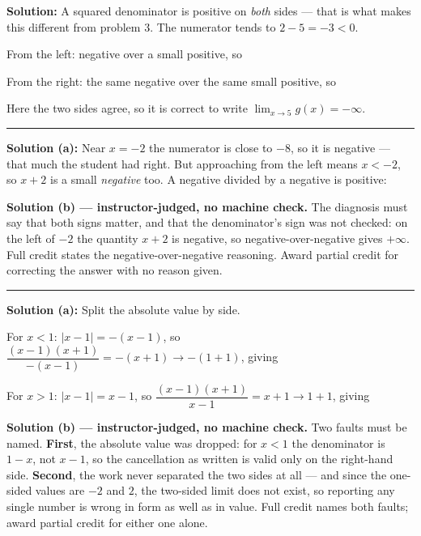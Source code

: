\documentclass[12pt]{article}
\begin{document}
\textbf{Solution:} A squared denominator is positive on \emph{both} sides ---
that is what makes this different from problem 3. The numerator tends to
$2 - 5 = -3 < 0$.

From the left: negative over a small positive, so \ans{-\infty}

From the right: the same negative over the same small positive, so
\ans{-\infty}

Here the two sides agree, so it is correct to write
$\lim_{x\to5} g(x) = -\infty$.

\vspace{0.2cm}\noindent\rule{\linewidth}{0.2pt}\vspace{0.2cm}


\textbf{Solution (a):} Near $x = -2$ the numerator is close to $-8$, so it is
negative --- that much the student had right. But approaching from the left
means $x < -2$, so $x + 2$ is a small \emph{negative} too. A negative divided by
a negative is positive:
\ans{+\infty}

\textbf{Solution (b) --- instructor-judged, no machine check.} The diagnosis
must say that both signs matter, and that the denominator's sign was not
checked: on the left of $-2$ the quantity $x + 2$ is negative, so
negative-over-negative gives $+\infty$. Full credit states the
negative-over-negative reasoning. Award partial credit for correcting the answer
with no reason given.

\vspace{0.2cm}\noindent\rule{\linewidth}{0.2pt}\vspace{0.2cm}


\textbf{Solution (a):} Split the absolute value by side.

For $x < 1$: $|x-1| = -(x-1)$, so
$\dfrac{(x-1)(x+1)}{-(x-1)} = -(x+1) \to -(1+1)$, giving

For $x > 1$: $|x-1| = x-1$, so $\dfrac{(x-1)(x+1)}{x-1} = x+1 \to 1+1$, giving

\textbf{Solution (b) --- instructor-judged, no machine check.} Two faults must
be named. \textbf{First}, the absolute value was dropped: for $x < 1$ the
denominator is $1 - x$, not $x - 1$, so the cancellation as written is valid only
on the right-hand side. \textbf{Second}, the work never separated the two sides
at all --- and since the one-sided values are $-2$ and $2$, the two-sided limit
does not exist, so reporting any single number is wrong in form as well as in
value. Full credit names both faults; award partial credit for either one alone.
\end{document}
